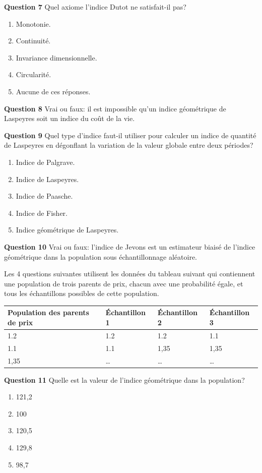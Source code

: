 \documentclass[]{article}
\begin{document}
\textbf{Question 7} Quel axiome l'indice Dutot ne satisfait-il pas?

\begin{enumerate}
\def\labelenumi{\alph{enumi})}
\item
  Monotonie.
\item
  Continuité.
\item
  Invariance dimensionnelle.
\item
  Circularité.
\item
  Aucune de ces réponses.
\end{enumerate}

\textbf{Question 8} Vrai ou faux: il est impossible qu'un indice géométrique de Laspeyres soit un indice du coût de la vie.

\textbf{Question 9} Quel type d'indice faut-il utiliser pour calculer un indice de quantité de Laspeyres en dégonflant la variation de la valeur globale entre deux périodes?

\begin{enumerate}
\def\labelenumi{\alph{enumi})}
\item
  Indice de Palgrave.
\item
  Indice de Laspeyres.
\item
  Indice de Paasche.
\item
  Indice de Fisher.
\item
  Indice géométrique de Laspeyres.
\end{enumerate}

\textbf{Question 10} Vrai ou faux: l'indice de Jevons est un estimateur biaisé de l'indice géométrique dans la population sous échantillonnage aléatoire.

Les 4 questions suivantes utilisent les données du tableau suivant qui contiennent une population de trois parents de prix, chacun avec une probabilité égale, et tous les échantillons possibles de cette population.

\begin{longtable}[]{@{}llll@{}}
\toprule
Population des parents de prix & Échantillon 1 & Échantillon 2 & Échantillon 3\tabularnewline
\midrule
\endhead
1.2 & 1.2 & 1.2 & 1.1\tabularnewline
1.1 & 1.1 & 1,35 & 1,35\tabularnewline
1,35 & \ldots{} & \ldots{} & \ldots{}\tabularnewline
\bottomrule
\end{longtable}

\textbf{Question 11} Quelle est la valeur de l'indice géométrique dans la population?

\begin{enumerate}
\def\labelenumi{\alph{enumi})}
\item
  121,2
\item
  100
\item
  120,5
\item
  129,8
\item
  98,7
\end{enumerate}
\end{document}
